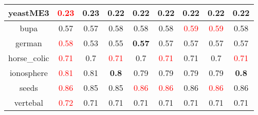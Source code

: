 \documentclass{article}%
\begin{document}
\begin{tabular}{c|cccccccc}
\hline%
yeastME3&\textcolor{red}{ 
0.23
}&0.23&0.22&0.22&0.22&0.22&0.22&0.22\\%
\hline%
bupa&0.57&0.57&0.58&0.58&0.58&\textcolor{red}{ 
0.59
}&\textcolor{red}{ 
0.59
}&0.58\\%
\hline%
german&\textcolor{red}{ 
0.58
}&0.53&0.55&\textbf{0.57}&0.57&0.57&0.57&0.57\\%
\hline%
horse\_colic&\textcolor{red}{ 
0.71
}&0.7&\textcolor{red}{ 
0.71
}&0.7&\textcolor{red}{ 
0.71
}&0.71&0.7&\textcolor{red}{ 
0.71
}\\%
\hline%
ionosphere&\textcolor{red}{ 
0.81
}&0.81&\textbf{0.8}&0.79&0.79&0.79&0.79&\textbf{0.8}\\%
\hline%
seeds&\textcolor{red}{ 
0.86
}&0.85&0.85&\textcolor{red}{ 
0.86
}&\textcolor{red}{ 
0.86
}&0.86&\textcolor{red}{ 
0.86
}&0.86\\%
\hline%
vertebal&\textcolor{red}{ 
0.72
}&0.71&0.71&0.71&0.71&0.71&0.71&0.71\\%
\hline%
\end{tabular}

%
\end{document}
